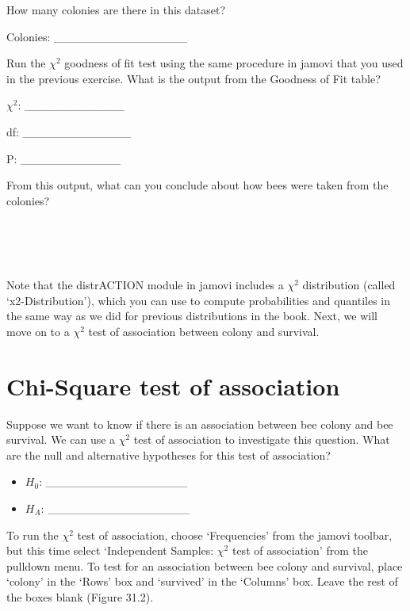 \documentclass[
  openany]{krantz}
\begin{document}
How many colonies are there in this dataset?

Colonies: \_\_\_\_\_\_\_\_\_\_\_\_\_\_\_\_

Run the \(\chi^{2}\) goodness of fit test using the same procedure in jamovi that you used in the previous exercise.
What is the output from the Goodness of Fit table?

\(\chi^{2}\): \_\_\_\_\_\_\_\_\_\_\_\_

df: \_\_\_\_\_\_\_\_\_\_\_\_\_

P: \_\_\_\_\_\_\_\_\_\_\_\_

From this output, what can you conclude about how bees were taken from the colonies?

\begin{verbatim}




\end{verbatim}

Note that the distrACTION module in jamovi includes a \(\chi^{2}\) distribution (called `x2-Distribution'), which you can use to compute probabilities and quantiles in the same way as we did for previous distributions in the book.
Next, we will move on to a \(\chi^{2}\) test of association between colony and survival.

\hypertarget{chi-square-test-of-association-1}{%
\section{Chi-Square test of association}\label{chi-square-test-of-association-1}}

Suppose we want to know if there is an association between bee colony and bee survival.
We can use a \(\chi^{2}\) test of association to investigate this question.
What are the null and alternative hypotheses for this test of association?

\begin{itemize}
\item
  \(H_{0}\): \_\_\_\_\_\_\_\_\_\_\_\_\_\_\_\_\_
\item
  \(H_{A}\): \_\_\_\_\_\_\_\_\_\_\_\_\_\_\_\_\_
\end{itemize}

To run the \(\chi^{2}\) test of association, choose `Frequencies' from the jamovi toolbar, but this time select `Independent Samples: \(\chi^{2}\) test of association' from the pulldown menu.
To test for an association between bee colony and survival, place `colony' in the `Rows' box and `survived' in the `Columns' box.
Leave the rest of the boxes blank (Figure 31.2).
\end{document}
